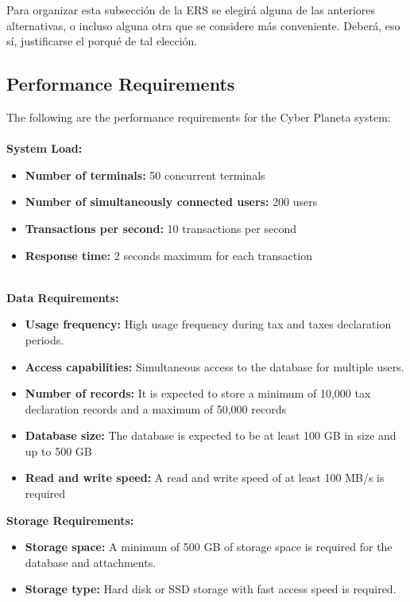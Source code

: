 \documentclass[12pt,a4paper, twosite]{article}
\begin{document}
Para organizar esta subsección de la ERS se elegirá alguna de las
anteriores alternativas, o incluso alguna otra que se considere más
conveniente. Deberá, eso sí, justificarse el porqué de tal elección.



\subsection{Performance Requirements}
\label{sec:org94bc543}

The following are the performance requirements for the Cyber Planeta system:\\
\\
\textbf{System Load:}

\begin{itemize}
    \item \textbf{Number of terminals:} 50 concurrent terminals
    \item \textbf{Number of simultaneously connected users: }200 users
    \item \textbf{Transactions per second: }10 transactions per second
    \item \textbf{Response time:} 2 seconds maximum for each transaction
\end{itemize}
\\
\textbf{Data Requirements:}
\begin{itemize}
    \item \textbf{Usage frequency:} High usage frequency during tax and taxes declaration periods.
    \item \textbf{Access capabilities:} Simultaneous access to the database for multiple users.
    \item \textbf{Number of records:} It is expected to store a minimum of 10,000 tax declaration records and a maximum of 50,000 records
    \item \textbf{Database size:} The database is expected to be at least 100 GB in size and up to 500 GB
    \item \textbf{Read and write speed:} A read and write speed of at least 100 MB/s is required    
\end{itemize}
\textbf{Storage Requirements:}
\begin{itemize}
    \item \textbf {Storage space:} A minimum of 500 GB of storage space is required for the database and attachments.
    \item \textbf {Storage type:} Hard disk or SSD storage with fast access speed is required.
\end{itemize}
\end{document}
